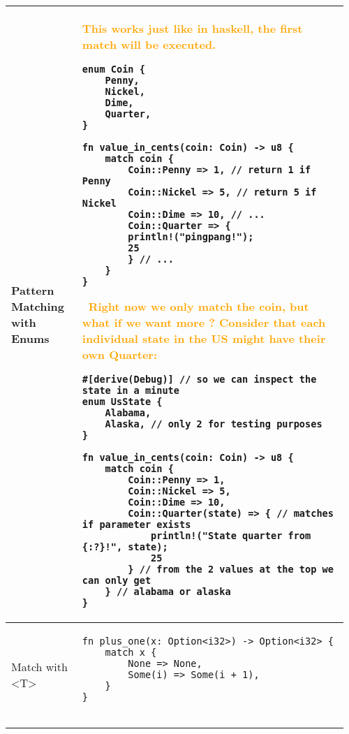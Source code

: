 \documentclass[main.tex,fontsize=8pt,paper=a4,paper=portrait,DIV=calc,]{scrartcl}
\begin{document}
\begin{table}[ht!]
\begin{tabular}{|m{0.2\linewidth}|m{0.755\linewidth}|}
\hline
Pattern Matching with Enums &
\textcolor{orange}{This works just like in haskell, the first match will be executed.}\newline
\begin{lstlisting}
enum Coin {
    Penny,
    Nickel,
    Dime,
    Quarter,
}

fn value_in_cents(coin: Coin) -> u8 {
    match coin {
        Coin::Penny => 1, // return 1 if Penny
        Coin::Nickel => 5, // return 5 if Nickel
        Coin::Dime => 10, // ...
        Coin::Quarter => {
        println!("pingpang!");
        25
        } // ...
    }
}
\end{lstlisting}
\, \newline
\textcolor{orange}{Right now we only match the coin, but what if we want more ? Consider that each individual state in the US might have their own Quarter:}\newline
\begin{lstlisting}
#[derive(Debug)] // so we can inspect the state in a minute
enum UsState {
    Alabama,
    Alaska, // only 2 for testing purposes
}

fn value_in_cents(coin: Coin) -> u8 {
    match coin {
        Coin::Penny => 1,
        Coin::Nickel => 5,
        Coin::Dime => 10,
        Coin::Quarter(state) => { // matches if parameter exists
            println!("State quarter from {:?}!", state);
            25
        } // from the 2 values at the top we can only get 
    } // alabama or alaska
}
\end{lstlisting}\\
\hline
Match with <T> & 
\begin{lstlisting}
fn plus_one(x: Option<i32>) -> Option<i32> {
    match x {
        None => None,
        Some(i) => Some(i + 1),
    }
}


\end{lstlisting}
\end{tabular}
\end{table}
\end{document}
